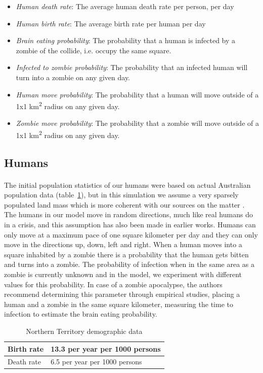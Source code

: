 \documentclass{report}
\begin{document}
\begin{itemize}
\item \emph{Human death rate}: The average human death rate per person, per day
\item \emph{Human birth rate}: The average birth rate per human per day
\item \emph{Brain eating probability}: The probability that a human is infected by a zombie of the collide, i.e. occupy the same square.
\item \emph{Infected to zombie probability}: The probability that an infected human will turn into a zombie on any given day.
\item \emph{Human move probability}: The probability that a human will move outside of a 1x1 km\textsuperscript{2} radius on any given day.
\item \emph{Zombie move probability}: The probability that a zombie will move outside of a 1x1 km\textsuperscript{2} radius on any given day.
\end{itemize}

\subsection{Humans}
\paragraph{}
The initial population statistics of our humans were based on actual Australian population data (table~\ref{AustralianData}), but in this simulation we assume a very sparsely populated land mass which is more coherent with our sources on the matter\cite{zombieland} . The humans in our model move in random directions, much like real humans do in a crisis, and this assumption has also been made in earlier works\cite{munz}. Humans can only move at a maximum pace of one square kilometer per day and they can only move in the directions up, down, left and right. When a human moves into a square inhabited by a zombie there is a probability that the human gets bitten and turns into a zombie. The probability of infection when in the same area as a zombie is currently unknown and in the model, we experiment with different values for this probability. In case of a zombie apocalypse, the authors recommend determining this parameter through empirical studies, placing a human and a zombie in the same square kilometer, measuring the time to infection to estimate the brain eating probability.
\begin{table}[h!]
\centering
    \begin{tabular}{|l|l|}
      \hline
        Birth rate & 13.3 per year per 1000 persons \\
      \hline
        Death rate & 6.5 per year per 1000 persons \\
      \hline
\end{tabular}
\caption{Northern Territory demographic data}\label{AustralianData}
\end{table}
\end{document}
